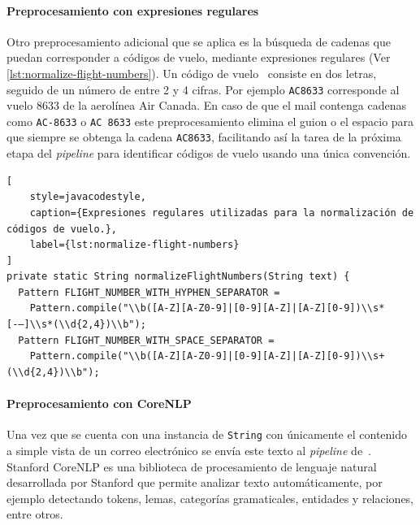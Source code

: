 \paragraph{Preprocesamiento con expresiones regulares}

Otro preprocesamiento adicional que se aplica es la búsqueda de cadenas que puedan corresponder a códigos de vuelo,
mediante expresiones regulares (Ver \autoref{lst:normalize-flight-numbers}).
Un código de vuelo~\cite{iata-airline-codes} consiste en dos letras, seguido de un número
de entre 2 y 4 cifras.
Por ejemplo \texttt{AC8633} corresponde al vuelo 8633 de la aerolínea Air Canada.
En caso de que el mail contenga cadenas como \texttt{AC-8633} o \texttt{AC 8633} este preprocesamiento elimina el guion
o el espacio para que siempre se obtenga la cadena \texttt{AC8633}, facilitando así la tarea de la próxima etapa del
\textit{pipeline} para identificar códigos de vuelo usando una única convención.

\begin{lstlisting}[
    style=javacodestyle,
    caption={Expresiones regulares utilizadas para la normalización de códigos de vuelo.},
    label={lst:normalize-flight-numbers}
]
private static String normalizeFlightNumbers(String text) {
  Pattern FLIGHT_NUMBER_WITH_HYPHEN_SEPARATOR =
    Pattern.compile("\\b([A-Z][A-Z0-9]|[0-9][A-Z]|[A-Z][0-9])\\s*[-–]\\s*(\\d{2,4})\\b");
  Pattern FLIGHT_NUMBER_WITH_SPACE_SEPARATOR =
    Pattern.compile("\\b([A-Z][A-Z0-9]|[0-9][A-Z]|[A-Z][0-9])\\s+(\\d{2,4})\\b");
\end{lstlisting}

\paragraph{Preprocesamiento con CoreNLP}\label{par:corenlp}

Una vez que se cuenta con una instancia de \texttt{String} con únicamente el contenido a simple vista de un correo
electrónico se envía este texto al \textit{pipeline} de~\cite{stanford-corenlp}.
Stanford CoreNLP es una biblioteca de procesamiento de lenguaje natural desarrollada por Stanford que permite analizar
texto automáticamente, por ejemplo detectando tokens, lemas, categorías gramaticales, entidades y relaciones, entre
otros.

